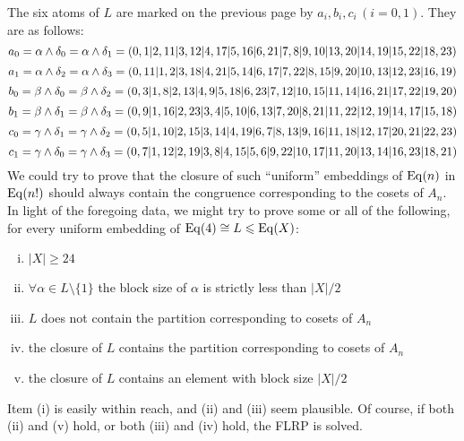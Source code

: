 The six atoms of $L$ are marked on the previous page by $a_i, b_i, c_i \, (i=0,1)$.  They are as follows:
{\scriptsize
\[
a_0 = \alpha \wedge \delta_0 = \alpha\wedge \delta_1 = (0,1|2,11|3,12|4,17|5,16|6,21|7,8|9,10|13,20|14,19|15,22|18,23)
\]
\[
a_1 = \alpha \wedge \delta_2 = \alpha\wedge \delta_3 = (0,11|1,2|3,18|4,21|5,14|6,17|7,22|8,15|9,20|10,13|12,23|16,19)
\]
\[
b_0 = \beta \wedge \delta_0 = \beta \wedge \delta_2 = (0,3|1,8|2,13|4,9|5,18|6,23|7,12|10,15|11,14|16,21|17,22|19,20)
\]
\[
b_1 =\beta \wedge \delta_1 = \beta\wedge \delta_3 = (0,9|1,16|2,23|3,4|5,10|6,13|7,20|8,21|11,22|12,19|14,17|15,18)
\]
\[
c_0 =\gamma \wedge \delta_1 = \gamma \wedge \delta_2 = (0,5|1,10|2,15|3,14|4,19|6,7|8,13|9,16|11,18|12,17|20,21|22,23)
\]
\[
c_1 =\gamma \wedge \delta_0 = \gamma \wedge \delta_3 = (0,7|1,12|2,19|3,8|4,15|5,6|9,22|10,17|11,20|13,14|16,23|18,21)
\]
}
We could try to prove that the closure of such
``uniform'' embeddings of $\operatorname{Eq}(n)$ in $\operatorname{Eq}(n!)$ should always contain the congruence 
corresponding to the cosets of $A_n$. 
In light of the foregoing data, we might try to prove some or all of the
following, for every uniform embedding of $\operatorname{Eq}(4)\cong L \leqslant \operatorname{Eq}(X)$:
\begin{enumerate}[(i)]
\item $|X|\geq 24$
\item $\forall \alpha \in L \setminus \{1\}$ the block size of $\alpha$ is strictly
  less than $|X|/2$
\item $L$ does not contain the partition corresponding to cosets of $A_n$
\item the closure of $L$ contains the partition corresponding to cosets of $A_n$
\item the closure of $L$ contains an element with block size $|X|/2$
\end{enumerate}
Item (i) is easily within reach, and (ii) and (iii) seem plausible. 
Of course,%
if both (ii) and (v) hold, or both (iii) and (iv) hold, the FLRP is solved.
